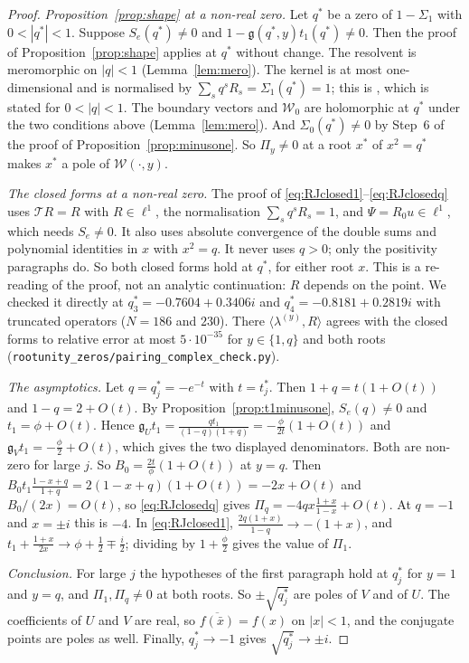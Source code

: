 \documentclass[11pt]{article}
\theoremstyle{plain}
\theoremstyle{definition}
\theoremstyle{remark}
\theoremstyle{plain}\newtheorem*{maintheorem}{Main Theorem}
\begin{document}
\begin{proof}
\emph{Proposition~\ref{prop:shape} at a non-real zero.} Let $q^\ast$ be a zero of $1-\Sigma_1$ with
$0<|q^\ast|<1$. Suppose $S_e(q^\ast)\ne0$ and $1-\mathfrak g(q^\ast,y)t_1(q^\ast)\ne0$. Then the
proof of Proposition~\ref{prop:shape} applies at $q^\ast$ without change. The resolvent is
meromorphic on $|q|<1$ (Lemma~\ref{lem:mero}). The kernel is at most one-dimensional and is
normalised by $\sum_sq^sR_s=\Sigma_1(q^\ast)=1$; this is
\cite[Lemma \textup{lem:nullspace}]{Bonfioli2026bB}, which is stated for $0<|q|<1$. The boundary
vectors and $\mathcal W_0$ are holomorphic at $q^\ast$ under the two conditions above
(Lemma~\ref{lem:mero}). And $\Sigma_0(q^\ast)\ne0$ by Step~6 of the proof of
Proposition~\ref{prop:minusone}. So $\Pi_y\ne0$ at a root $x^\ast$ of $x^2=q^\ast$ makes $x^\ast$ a
pole of $\mathcal W(\cdot,y)$.

\emph{The closed forms at a non-real zero.} The proof of \eqref{eq:RJclosed1}--\eqref{eq:RJclosedq}
uses $\mathcal TR=R$ with $R\in\ell^1$, the normalisation $\sum_sq^sR_s=1$, and $\Psi=R_0u\in\ell^1$,
which needs $S_e\ne0$. It also uses absolute convergence of the double sums and polynomial
identities in $x$ with $x^2=q$. It never uses $q>0$; only the positivity paragraphs do. So both
closed forms hold at $q^\ast$, for either root $x$. This is a re-reading of the proof, not an analytic
continuation: $R$ depends on the point. We checked it directly at $q^\ast_3=-0.7604+0.3406i$ and
$q^\ast_4=-0.8181+0.2819i$ with truncated operators ($N=186$ and $230$). There
$\langle\lambda^{(y)},R\rangle$ agrees with the closed forms to relative error at most
$5\cdot10^{-35}$ for $y\in\{1,q\}$ and both roots
(\texttt{rootunity\_zeros/pairing\_complex\_check.py}).

\emph{The asymptotics.} Let $q=q^\ast_j=-e^{-t}$ with $t=t^\ast_j$. Then $1+q=t(1+O(t))$ and
$1-q=2+O(t)$. By Proposition~\ref{prop:t1minusone}, $S_e(q)\ne0$ and $t_1=\phi+O(t)$. Hence
$\mathfrak g_Ut_1=\frac{qt_1}{(1-q)(1+q)}=-\frac\phi{2t}(1+O(t))$ and
$\mathfrak g_Vt_1=-\frac\phi2+O(t)$, which gives the two displayed denominators. Both are non-zero
for large $j$. So $B_0=\frac{2t}\phi(1+O(t))$ at $y=q$. Then
$B_0t_1\frac{1-x+q}{1+q}=2(1-x+q)(1+O(t))=-2x+O(t)$ and $B_0/(2x)=O(t)$, so
\eqref{eq:RJclosedq} gives $\Pi_q=-4qx\frac{1+x}{1-x}+O(t)$. At $q=-1$ and $x=\pm i$ this is $-4$.
In \eqref{eq:RJclosed1}, $\frac{2q(1+x)}{1-q}\to-(1+x)$, and
$t_1+\frac{1+x}{2x}\to\phi+\frac12\mp\frac i2$; dividing by $1+\frac\phi2$ gives the value
of $\Pi_1$.

\emph{Conclusion.} For large $j$ the hypotheses of the first paragraph hold at $q^\ast_j$ for $y=1$
and $y=q$, and $\Pi_1,\Pi_q\ne0$ at both roots. So $\pm\sqrt{q^\ast_j}$ are poles of $V$ and of
$U$. The coefficients of $U$ and $V$ are real, so $\overline{f(\bar x)}=f(x)$ on $|x|<1$, and the
conjugate points are poles as well. Finally, $q^\ast_j\to-1$ gives $\sqrt{q^\ast_j}\to\pm i$.
\end{proof}
\end{document}
